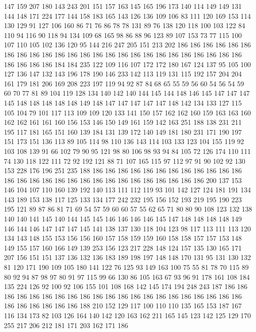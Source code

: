 147 159 207 180 143 243 201 151 157 163 145 165 196 173 140 114 149 149 131 144
148 171 224 177 144 158 183 165 143 126 136 109 106 83 111 120 169 153 114 130
129 91 127 106 160 86 71 76 86 78 78 131 89 76 138 120 118 100 103 122
84 110 94 116 90 118 94 134 109 68 165 98 86 88 96 123 89 107 153 73
77 115 100 107 110 105 102 136 120 95 144 216 247 205 151 213 202 186 186 186
186 186 186 186 186 186 186 186 186 186 186 186 186 186 186 186 186 186 186 186
186 186 186 186 186 186 184 184 235 122 109 116 107 172 172 180 167 124 137 95
105 100 127 136 147 132 143 196 178 190 146 233 142 113 119 131 115 192 157 204
204 161 179 181 206 169 208 223 197 119 94 92 87 84 68 65 55 59 56 60
54 56 54 59 60 70 77 81 89 104 119 128 134 140 142 140 144 145 144 148
146 145 147 147 147 145 148 148 148 148 148 149 148 147 147 147 147 147 148 142
134 133 127 115 105 104 79 101 117 113 109 109 120 133 141 150 157 162 162 160
159 163 163 160 162 162 161 161 160 156 153 146 150 149 161 159 142 163 251 188
138 231 211 195 117 181 165 151 160 139 184 131 139 172 140 149 181 180 231 171
190 197 151 173 151 136 113 89 105 114 98 110 136 143 114 103 133 123 104 155
119 92 103 108 139 91 66 102 79 90 95 121 98 80 106 98 93 94 84 105
72 126 174 110 111 74 130 118 122 111 72 92 192 121 88 71 107 165 115 97
112 97 91 90 102 92 130 153 228 176 196 251 235 188 186 186 186 186 186 186
186 186 186 186 186 186 186 186 186 186 186 186 186 186 186 186 186 186 186 186
186 186 200 137 153 146 104 107 110 160 139 192 140 113 111 112 119 93 101 142
127 124 181 191 134 143 189 153 138 117 125 133 134 177 242 232 195 156 152 193
219 195 190 223 195 121 89 87 86 81 71 69 54 57 59 60 60 57 55 62
65 71 80 80 90 108 123 132 138 140 140 141 145 140 144 145 145 146 146 146
146 145 147 148 148 148 148 149 146 144 146 147 147 147 145 141 138 137 130 118
104 123 98 117 113 111 113 120 134 143 148 155 153 156 156 160 157 158 159 159
160 158 158 157 157 153 148 149 155 157 160 166 149 139 253 156 123 217 228 148
124 157 135 130 165 171 207 156 151 151 137 136 132 136 183 189 198 197 148 148
170 131 95 131 130 132 81 120 171 190 109 105 180 141 122 76 125 93 149 163
100 75 55 81 78 70 115 89 80 92 94 87 98 97 80 91 97 115 99 66
130 86 105 163 67 93 96 91 178 161 108 184 135 224 126 92 100 92 106 155
101 108 168 142 145 174 194 248 243 187 186 186 186 186 186 186 186 186 186 186
186 186 186 186 186 186 186 186 186 186 186 186 186 186 186 186 186 188 210 152
129 117 100 110 110 135 165 153 187 167 116 134 173 82 103 126 164 140 142 120
163 162 211 165 145 123 142 125 129 170 255 217 206 212 181 171 203 162 171 186
